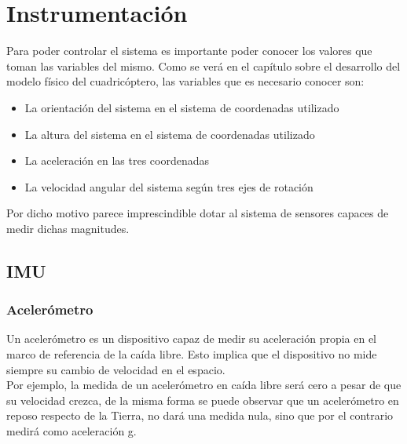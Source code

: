 \documentclass[main]{subfiles}
\begin{document}
\section{Instrumentaci\'on}
\vspace*{15pt}
Para poder controlar el sistema es importante poder conocer los valores que toman las variables del mismo. Como se ver\'a en el cap\'itulo sobre el desarrollo del modelo f\'isico del cuadric\'optero, las variables que es necesario conocer son:

\begin{itemize}
\item La orientaci\'on del sistema en el sistema de coordenadas utilizado
\item La altura del sistema en el sistema de coordenadas utilizado
\item La aceleraci\'on en las tres coordenadas
\item La velocidad angular del sistema seg\'un tres ejes de rotaci\'on
\end{itemize}

Por dicho motivo parece imprescindible dotar al sistema de sensores capaces de medir dichas magnitudes.
\subsection{IMU}

\subsubsection{Aceler\'ometro}
\label{acelerometro}

Un aceler\'ometro es un dispositivo capaz de medir su aceleraci\'on propia en el marco de referencia de la ca\'ida libre. Esto implica que el dispositivo no mide siempre su cambio de velocidad en el espacio.\\
Por ejemplo, la medida de un aceler\'ometro en ca\'ida libre ser\'a cero a pesar de que su velocidad crezca, de la misma forma se puede observar que un aceler\'ometro en reposo respecto de la Tierra, no dar\'a una medida nula, sino que por el contrario medir\'a como aceleraci\'on g.\\
\end{document}
